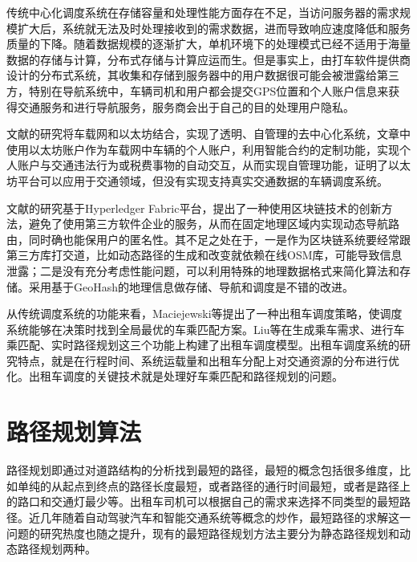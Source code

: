 传统中心化调度系统在存储容量和处理性能方面存在不足，当访问服务器的需求规模扩大后，系统就无法及时处理接收到的需求数据，进而导致响应速度降低和服务质量的下降。随着数据规模的逐渐扩大，单机环境下的处理模式已经不适用于海量数据的存储与计算，分布式存储与计算应运而生。但是事实上，由打车软件提供商设计的分布式系统，其收集和存储到服务器中的用户数据很可能会被泄露给第三方，特别在导航系统中，车辆司机和用户都会提交GPS位置和个人账户信息来获得交通服务和进行导航服务，服务商会出于自己的目的处理用户隐私。

文献的研究将车载网和以太坊结合，实现了透明、自管理的去中心化系统，文章中使用以太坊账户作为车载网中车辆的个人账户，利用智能合约的定制功能，实现个人账户与交通违法行为或税费事物的自动交互，从而实现自管理功能，证明了以太坊平台可以应用于交通领域，但没有实现支持真实交通数据的车辆调度系统。

文献的研究基于Hyperledger Fabric平台，提出了一种使用区块链技术的创新方法，避免了使用第三方软件企业的服务，从而在固定地理区域内实现动态导航路由，同时确也能保用户的匿名性。其不足之处在于，一是作为区块链系统要经常跟第三方库打交道，比如动态路径的生成和改变就依赖在线OSM库，可能导致信息泄露；二是没有充分考虑性能问题，可以利用特殊的地理数据格式来简化算法和存储。采用基于GeoHash的地理信息做存储、导航和调度是不错的改进。

从传统调度系统的功能来看，Maciejewski等提出了一种出租车调度策略，使调度系统能够在决策时找到全局最优的车乘匹配方案。Liu等在生成乘车需求、进行车乘匹配、实时路径规划这三个功能上构建了出租车调度模型。出租车调度系统的研究特点，就是在行程时间、系统运载量和出租车分配上对交通资源的分布进行优化。出租车调度的关键技术就是处理好车乘匹配和路径规划的问题。

\section{路径规划算法}
路径规划即通过对道路结构的分析找到最短的路径，最短的概念包括很多维度，比如单纯的从起点到终点的路径长度最短，或者路径的通行时间最短，或者是路径上的路口和交通灯最少等。出租车司机可以根据自己的需求来选择不同类型的最短路径。近几年随着自动驾驶汽车和智能交通系统等概念的炒作，最短路径的求解这一问题的研究热度也随之提升，现有的最短路径规划方法主要分为静态路径规划和动态路径规划两种。

